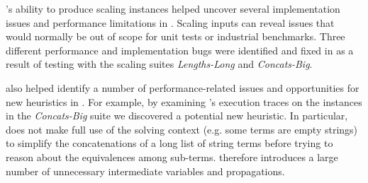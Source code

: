 \fuzzer{}'s ability to produce scaling instances helped uncover several
implementation issues and performance limitations in \us{}. Scaling inputs
can reveal issues that would normally be out of scope for unit tests or
industrial benchmarks. Three different
performance and implementation bugs were identified and fixed in \us{}
as a result of testing with the \fuzzer{} scaling suites
\textit{Lengths-Long} and \textit{Concats-Big}.

\fuzzer{} also helped identify a number of performance-related issues and
opportunities for new heuristics in \us{}. For example, by examining \us{}'s
execution traces on the
instances in the \textit{Concats-Big} suite we discovered a
potential new heuristic. In particular, \us{} does not
make full use of the solving context (e.g. some terms are empty
strings) to simplify the concatenations of a long list of string terms
before trying to reason about the equivalences among sub-terms. \us{}
therefore introduces a large number of unnecessary intermediate
variables and propagations.

